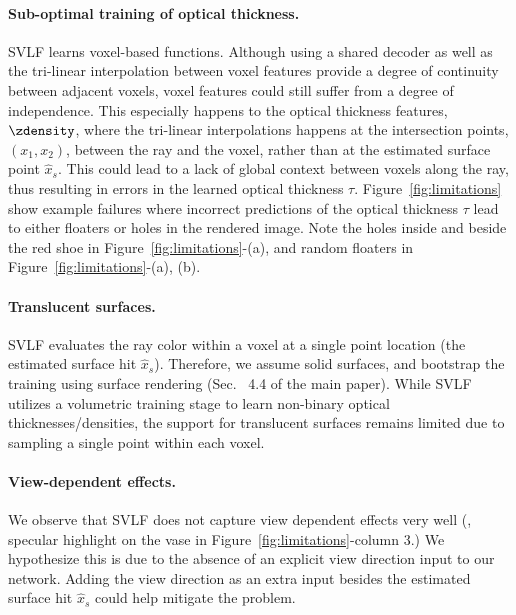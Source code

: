\paragraph{Sub-optimal training of optical thickness.}
SVLF learns voxel-based functions.
Although using a shared decoder as well as the tri-linear interpolation between voxel features provide a degree of continuity between adjacent voxels,
voxel features could still suffer from a degree of independence.
This especially happens to the optical thickness features, $\zdensity$, where the tri-linear interpolations happens at the intersection points, $(x_1, x_2)$, between the ray and the voxel, rather than at the estimated surface point $\hat{x}_s$.
This could lead to a lack of global context between voxels along the ray, thus resulting in errors in the learned optical thickness $\tau$.
Figure~\ref{fig:limitations} show example failures where incorrect predictions of the optical thickness $\tau$ lead to either floaters or holes in the rendered image.
Note the holes inside and beside the red shoe in Figure~\ref{fig:limitations}-(a),
and random floaters in Figure~\ref{fig:limitations}-(a), (b).

\paragraph{Translucent surfaces.}
SVLF evaluates the ray color within a voxel at a single point location (the estimated surface hit $\hat{x}_s$).
Therefore, we assume solid surfaces, and bootstrap the training using surface rendering (Sec.~{\color{red} 4.4} of the main paper).
While SVLF utilizes a volumetric training stage to learn non-binary optical thicknesses/densities, the support for translucent surfaces remains limited 
due to sampling a single point within each voxel.

\paragraph{View-dependent effects.}
We observe that SVLF does not capture view dependent effects very well (\eg, specular highlight on the vase in Figure~\ref{fig:limitations}-column 3.)
We hypothesize this is due to the absence of an explicit view direction input to our network.
Adding the view direction as an extra input besides the estimated surface hit $\hat{x}_s$ could help mitigate the problem. 



